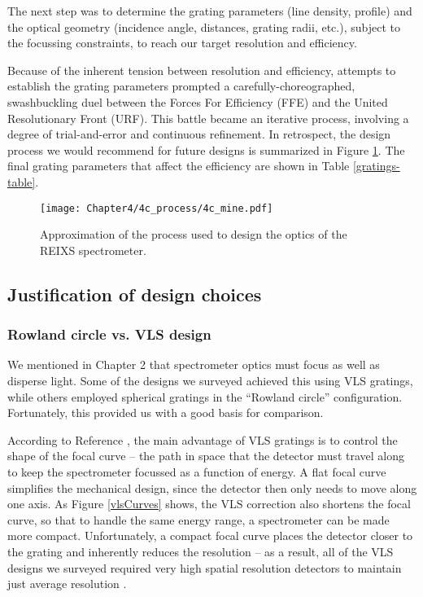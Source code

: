 The next step was to determine the grating parameters (line density, profile) and the optical geometry (incidence angle, distances, grating radii, etc.), subject to the focussing constraints, to reach our target resolution and efficiency.

Because of the inherent tension between resolution and efficiency, attempts to establish the grating parameters prompted a carefully-choreographed, swashbuckling duel between the Forces For Efficiency (FFE) and the United Resolutionary Front (URF).  This battle became an iterative process, involving a degree of trial-and-error and continuous refinement.  In retrospect, the design process we would recommend for future designs is summarized in Figure \ref{4c}.  The final grating parameters that affect the efficiency are shown in Table \ref{gratings-table}.

\begin{figure}[htbp] %
   \centering
   \texttt{[image: Chapter4/4c\_process/4c\_mine.pdf]} 
   \caption{Approximation of the process used to design the optics of the REIXS spectrometer.}
   \label{4c}
\end{figure}

\subsection{Justification of design choices}
\subsubsection{Rowland circle vs. VLS design} 
\label{rowlandVsVLS}
We mentioned in Chapter 2 that spectrometer optics must focus as well as disperse light.  Some of the designs we surveyed achieved this using VLS gratings, while others employed spherical gratings in the ``Rowland circle'' configuration.  Fortunately, this provided us with a good basis for comparison.

According to Reference \cite{Mui06}, the main advantage of VLS gratings is to control the shape of the focal curve -- the path in space that the detector must travel along to keep the spectrometer focussed as a function of energy.  A flat focal curve simplifies the mechanical design, since the detector then only needs to move along one axis.  As Figure \ref{vlsCurves} shows, the VLS correction also shortens the focal curve, so that to handle the same energy range, a spectrometer can be made more compact.  Unfortunately, a compact focal curve places the detector closer to the grating and inherently reduces the resolution -- as a result, all of the VLS designs we surveyed required very high spatial resolution detectors to maintain just average resolution \cite[Table 3.3]{Mui06}.

